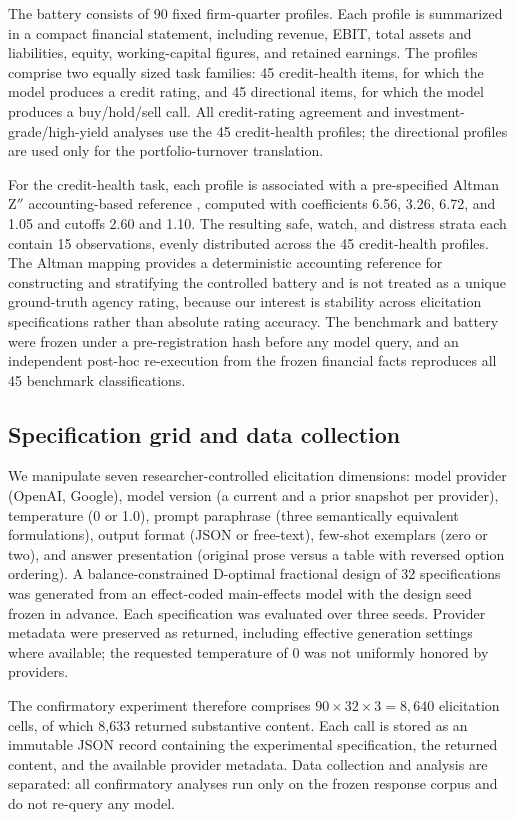 \documentclass[pdflatex,sn-nature,lineno]{sn-jnl}
\theoremstyle{thmstyleone}
\begin{document}
The battery consists of 90 fixed firm-quarter profiles. Each profile is summarized in a compact financial
statement, including revenue, EBIT, total assets and liabilities, equity, working-capital figures, and
retained earnings. The profiles comprise two equally sized task families: 45 credit-health items, for
which the model produces a credit rating, and 45 directional items, for which the model produces a
buy/hold/sell call. All credit-rating agreement and investment-grade/high-yield analyses use the 45
credit-health profiles; the directional profiles are used only for the portfolio-turnover translation.

For the credit-health task, each profile is associated with a pre-specified Altman Z$''$ accounting-based
reference \cite{altman1968}, computed with coefficients 6.56, 3.26, 6.72, and 1.05 and cutoffs 2.60 and
1.10. The resulting safe, watch, and distress strata each contain 15 observations, evenly distributed
across the 45 credit-health profiles. The Altman mapping provides a deterministic accounting reference
for constructing and stratifying the controlled battery and is not treated as a unique ground-truth
agency rating, because our interest is stability across elicitation specifications rather than absolute
rating accuracy. The benchmark and battery were frozen under a pre-registration hash before any model
query, and an independent post-hoc re-execution from the frozen financial facts reproduces all 45
benchmark classifications.

\subsection{Specification grid and data collection}
We manipulate seven researcher-controlled elicitation dimensions: model provider (OpenAI, Google),
model version (a current and a prior snapshot per provider), temperature (0 or 1.0), prompt paraphrase
(three semantically equivalent formulations), output format (JSON or free-text), few-shot exemplars (zero
or two), and answer presentation (original prose versus a table with reversed option ordering). A
balance-constrained D-optimal fractional design of 32 specifications was generated from an effect-coded
main-effects model with the design seed frozen in advance. Each specification was evaluated over three
seeds. Provider metadata were preserved as returned, including effective generation settings where
available; the requested temperature of 0 was not uniformly honored by providers.

The confirmatory experiment therefore comprises $90\times32\times3=8{,}640$ elicitation cells, of which
8{,}633 returned substantive content. Each call is stored as an immutable JSON record containing the experimental specification, the
returned content, and the available provider metadata. Data collection and analysis are separated: all
confirmatory analyses run only on the frozen response corpus and do not re-query any model.
\end{document}
